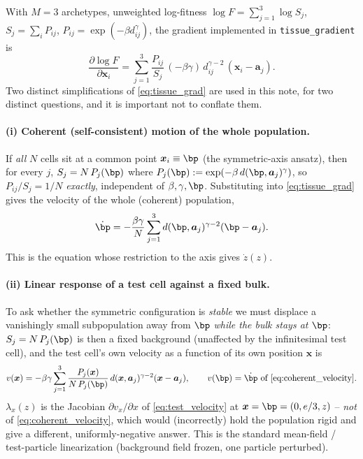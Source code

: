 \documentclass[11pt,a4paper]{article}
\theoremstyle{plain}
\theoremstyle{definition}
\theoremstyle{remark}
\newcommand{\bx}{\bm{x}}
\newcommand{\ba}{\bm{a}}
\newcommand{\lam}{\lambda}
\newcommand{\bw}{\beta}
\begin{document}
With $M=3$ archetypes, unweighted log-fitness $\log F=\sum_{j=1}^3\log S_j$,
$S_j=\sum_i P_{ij}$, $P_{ij}=\exp(-\bw d_{ij}^\gamma)$, the gradient
implemented in \texttt{tissue\_gradient} is
\begin{equation}
\frac{\partial \log F}{\partial \bx_i}
=\sum_{j=1}^3 \frac{P_{ij}}{S_j}\,(-\bw\gamma)\,d_{ij}^{\gamma-2}\,(\bx_i-\ba_j).
\label{eq:tissue_grad}
\end{equation}
Two distinct simplifications of \eqref{eq:tissue_grad} are used in this
note, for two distinct questions, and it is important not to conflate them.

\paragraph{(i) Coherent (self-consistent) motion of the whole population.}
If \emph{all} $N$ cells sit at a common point $\bx_i\equiv\bp$ (the
symmetric-axis ansatz), then for every $j$, $S_j=N\,P_j(\bp)$ where
$P_j(\bp):=\exp(-\bw\,d(\bp,\ba_j)^\gamma)$, so $P_{ij}/S_j=1/N$
\emph{exactly}, independent of $\bw,\gamma,\bp$. Substituting into
\eqref{eq:tissue_grad} gives the velocity of the whole (coherent)
population,
\begin{equation}
\dot\bp=-\frac{\bw\gamma}{N}\sum_{j=1}^3 d(\bp,\ba_j)^{\gamma-2}(\bp-\ba_j).
\label{eq:coherent_velocity}
\end{equation}
This is the equation whose restriction to the axis gives $\dot z(z)$.

\paragraph{(ii) Linear response of a test cell against a fixed bulk.}
To ask whether the symmetric configuration is \emph{stable} we must
displace a vanishingly small subpopulation away from $\bp$ \emph{while the
bulk stays at $\bp$}: $S_j=N\,P_j(\bp)$ is then a fixed background
(unaffected by the infinitesimal test cell), and the test cell's own
velocity as a function of its own position $\bx$ is
\begin{equation}
v(\bx)=-\bw\gamma\sum_{j=1}^3 \frac{P_j(\bx)}{N\,P_j(\bp)}\,d(\bx,\ba_j)^{\gamma-2}(\bx-\ba_j),
\qquad v(\bp)=\dot\bp\ \text{of \eqref{eq:coherent_velocity}}.
\label{eq:test_velocity}
\end{equation}
$\lam_x(z)$ is the Jacobian $\partial v_x/\partial x$ of \eqref{eq:test_velocity}
at $\bx=\bp=(0,e/3,z)$ -- \emph{not} of \eqref{eq:coherent_velocity}, which
would (incorrectly) hold the population rigid and give a different,
uniformly-negative answer. This is the standard mean-field / test-particle
linearization (background field frozen, one particle perturbed).
\end{document}
